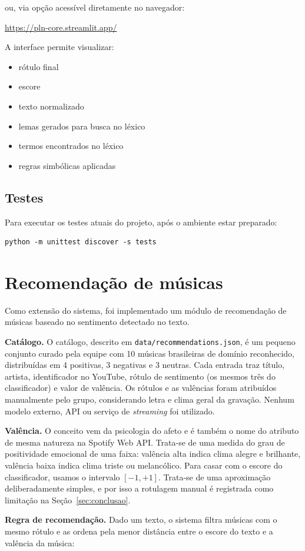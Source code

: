 \documentclass[11pt,a4paper]{article}
\newenvironment{newblock}{\par\color{newblue}}{\par\color{black}}
\begin{document}
ou, via opção acessível diretamente no navegador:

\url{https://pln-core.streamlit.app/}


A interface permite visualizar:
\begin{itemize}
  \item rótulo final
  \item escore
  \item texto normalizado
  \item lemas gerados para busca no léxico
  \item termos encontrados no léxico
  \item regras simbólicas aplicadas
\end{itemize}

\subsection*{Testes}

Para executar os testes atuais do projeto, após o ambiente estar preparado:

\begin{verbatim}
python -m unittest discover -s tests
\end{verbatim}

\section{Recomendação de músicas}

Como extensão do sistema, foi implementado um módulo de recomendação de músicas baseado no sentimento detectado no texto.

\begin{newblock}
\textbf{Catálogo.} O catálogo, descrito em \texttt{data/recommendations.json}, é um pequeno conjunto curado pela equipe com 10 músicas brasileiras de domínio reconhecido, distribuídas em 4 positivas, 3 negativas e 3 neutras. Cada entrada traz título, artista, identificador no YouTube, rótulo de sentimento (os mesmos três do classificador) e valor de valência. Os rótulos e as valências foram atribuídos manualmente pelo grupo, considerando letra e clima geral da gravação. Nenhum modelo externo, API ou serviço de \emph{streaming} foi utilizado.

\textbf{Valência.} O conceito vem da psicologia do afeto \citep{russell1980circumplex} e é também o nome do atributo de mesma natureza na Spotify Web API. Trata-se de uma medida do grau de positividade emocional de uma faixa: valência alta indica clima alegre e brilhante, valência baixa indica clima triste ou melancólico. Para casar com o escore do classificador, usamos o intervalo $[-1, +1]$. Trata-se de uma aproximação deliberadamente simples, e por isso a rotulagem manual é registrada como limitação na Seção~\ref{sec:conclusao}.

\textbf{Regra de recomendação.} Dado um texto, o sistema filtra músicas com o mesmo rótulo e as ordena pela menor distância entre o escore do texto e a valência da música:
\end{newblock}
\end{document}
